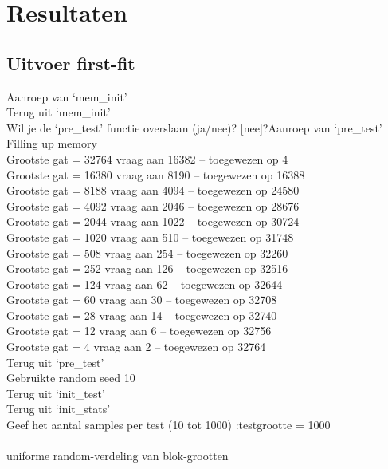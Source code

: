 \documentclass[a4paper]{article}
\begin{document}
	\newpage

	\section{Resultaten}\label{sec:resultaten}
		\subsection{Uitvoer first-fit}\label{sec:uitvoerff}
			Aanroep van `mem\_init'\\
			Terug uit `mem\_init'\\
			Wil je de `pre\_test' functie overslaan (ja/nee)? [nee]?Aanroep van `pre\_test'\\
			Filling up memory\\
			Grootste gat = 32764	 vraag aan 16382 -- toegewezen op 4\\
			Grootste gat = 16380	 vraag aan 8190 -- toegewezen op 16388\\
			Grootste gat = 8188	 vraag aan 4094 -- toegewezen op 24580\\
			Grootste gat = 4092	 vraag aan 2046 -- toegewezen op 28676\\
			Grootste gat = 2044	 vraag aan 1022 -- toegewezen op 30724\\
			Grootste gat = 1020	 vraag aan 510 -- toegewezen op 31748\\
			Grootste gat = 508	 vraag aan 254 -- toegewezen op 32260\\
			Grootste gat = 252	 vraag aan 126 -- toegewezen op 32516\\
			Grootste gat = 124	 vraag aan 62 -- toegewezen op 32644\\
			Grootste gat = 60	 vraag aan 30 -- toegewezen op 32708\\
			Grootste gat = 28	 vraag aan 14 -- toegewezen op 32740\\
			Grootste gat = 12	 vraag aan 6 -- toegewezen op 32756\\
			Grootste gat = 4	 vraag aan 2 -- toegewezen op 32764\\
			Terug uit `pre\_test'\\
			Gebruikte random seed 10\\
			Terug uit `init\_test'\\
			Terug uit `init\_stats'\\
			Geef het aantal samples per test (10 tot 1000) :testgrootte = 1000\\
			\\
			uniforme random-verdeling van blok-grootten\\
\end{document}
